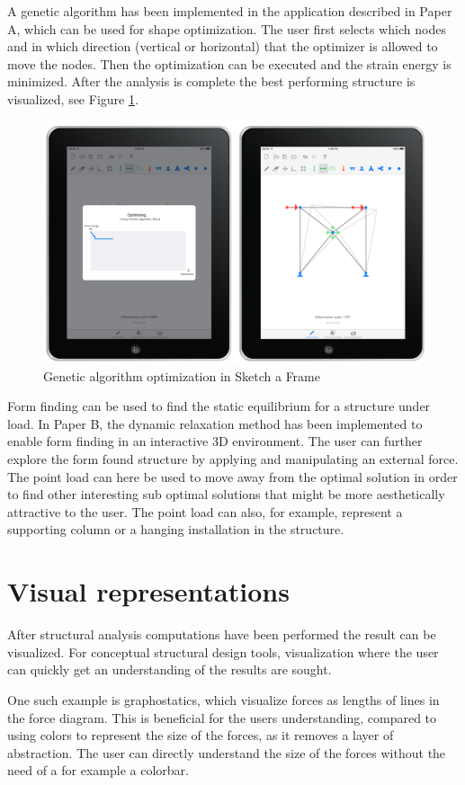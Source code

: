A genetic algorithm has been implemented in the application described in Paper A, which can be used for shape optimization. The user first selects which nodes and in which direction (vertical or horizontal) that the optimizer is allowed to move the nodes. Then the optimization can be executed and the strain energy is minimized. After the analysis is complete the best performing structure is visualized, see Figure \ref{fig:ipad-ga}. 

\begin{figure}
  \includegraphics[width=330pt]{graphics/ipad-ga.png}
  \caption{Genetic algorithm optimization in Sketch a Frame}
  \label{fig:ipad-ga}
\end{figure}

Form finding can be used to find the static equilibrium for a structure under load. In Paper B, the dynamic relaxation method has been implemented to enable form finding in an interactive 3D environment. The user can further explore the form found structure by applying and manipulating an external force. The point load can here be used to move away from the optimal solution in order to find other interesting sub optimal solutions that might be more aesthetically attractive to the user. The point load can also, for example, represent a supporting column or a hanging installation in the structure.


\section{Visual representations}
After structural analysis computations have been performed the result can be visualized. For conceptual structural design tools, visualization where the user can quickly get an understanding of the results are sought. 

One such example is graphostatics, which visualize forces as lengths of lines in the force diagram. This is beneficial for the users understanding, compared to using colors to represent the size of the forces, as it removes a layer of abstraction. The user can directly understand the size of the forces without the need of a for example a colorbar.

